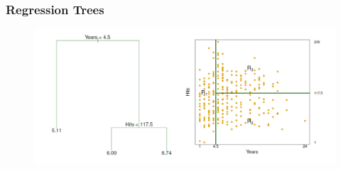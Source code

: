 \documentclass[
  shownotes,
  xcolor={svgnames},
  hyperref={colorlinks,citecolor=DarkBlue,linkcolor=DarkRed,urlcolor=DarkBlue}
  , aspectratio=169]{beamer}
\begin{document}
\begin{frame}[fragile]
\frametitle{Regression Trees}


\begin{figure}[H] \centering
            \captionsetup{justification=centering}
              \includegraphics[scale=0.4]{figures/hitters.png}                           
 \end{figure}
\end{frame}

\end{document}
